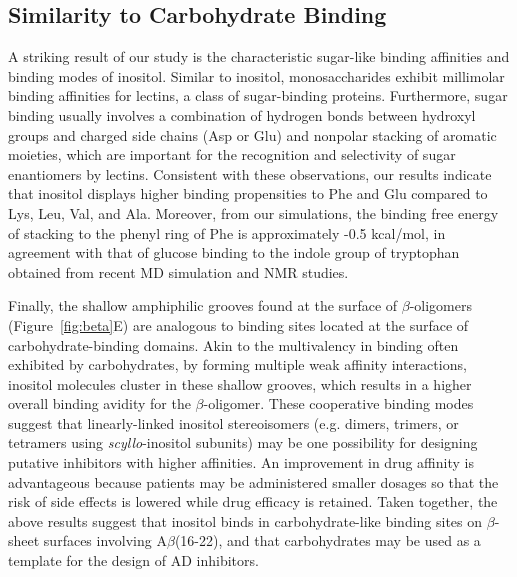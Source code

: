 \subsection{Similarity to Carbohydrate Binding}
A striking result of our study is the characteristic sugar-like\cite{Taroni:2000uh} binding affinities and binding modes of inositol. Similar to inositol, monosaccharides exhibit millimolar binding affinities for lectins, a class of sugar-binding proteins.\cite{Schnupf:2010p6654,Geisler:2010p188} Furthermore, sugar binding usually involves a combination of hydrogen bonds between hydroxyl groups and charged side chains (Asp or Glu) and nonpolar stacking of aromatic moieties, which are important for the recognition and selectivity of sugar enantiomers by lectins.\cite{Sharon:2001p215} Consistent with these observations, our results indicate that inositol displays higher binding propensities to Phe and Glu compared to Lys, Leu, Val, and Ala. Moreover, from our simulations, the binding free energy of stacking to the phenyl ring of Phe is approximately -0.5 kcal/mol,  in agreement with that of glucose binding to the indole group of tryptophan obtained from recent MD simulation\cite{Schnupf:2010p6654} and NMR studies.\cite{Kiehna:2007p163}

Finally, the shallow amphiphilic grooves found at the surface of $\beta$-oligomers (Figure~\ref{fig:beta}E) are analogous to binding sites located at the surface of carbohydrate-binding domains.\cite{Taroni:2000uh,Kulharia:2009p212,Weis:1996p225} Akin to the multivalency in binding often exhibited by carbohydrates,\mbox{\cite{Lee:1995ul}} by forming multiple weak affinity interactions, inositol molecules cluster in these shallow grooves, which results in a higher overall binding avidity for the $\beta$-oligomer. These cooperative binding modes suggest that linearly-linked inositol stereoisomers (e.g. dimers, trimers, or tetramers using \emph{scyllo}-inositol subunits) may be one possibility for designing putative inhibitors with higher affinities.\mbox{\cite{Krishnamurthy:2006vi}} An improvement in drug affinity is advantageous because patients may be administered smaller dosages so that the risk of side effects is lowered while drug efficacy is retained. Taken together, the above results suggest that inositol binds in carbohydrate-like binding sites on $\beta$-sheet surfaces involving A$\beta$(16-22), and that carbohydrates may be used as a template for the design of AD inhibitors.

